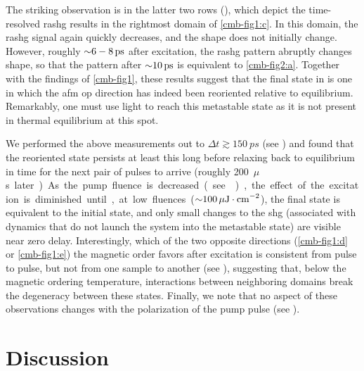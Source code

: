 The striking observation is in the latter two rows (), which depict the time-resolved \gls{rashg} results in the rightmost domain of \cref{cmb-fig1:c}.
In this domain, the \gls{rashg} signal again quickly decreases, and the shape does not initially change.
However, roughly ${\sim} \num{6}-\qty{8}{ps}$ after excitation, the \gls{rashg} pattern abruptly changes shape, so that the pattern after ${\sim} \qty{10}{ps}$ is equivalent to \cref{cmb-fig2:a}.
Together with the findings of \cref{cmb-fig1}, these results suggest that the final state in  is one in which the \gls{afm} \gls{op} direction has indeed been reoriented relative to equilibrium.
Remarkably, one must use light to reach this metastable state as it is not present in thermal equilibrium at this spot.

We performed the above measurements out to $\Delta t \gtrsim \qty{150}{ps}$ (see ) and found that the reoriented state persists at least this long before relaxing back to equilibrium in time for the next pair of pulses to arrive (roughly \qty{200}{$\mu$ s} later).
As the pump fluence is decreased (see ), the effect of the excitation is diminished until, at low fluences (${\sim} \qty{100}{\mu J \cdot cm^{-2}}$), the final state is equivalent to the initial state, and only small changes to the \gls{shg} (associated with dynamics that do not launch the system into the metastable state) are visible near zero delay.
Interestingly, which of the two opposite directions (\cref{cmb-fig1:d} or \cref{cmb-fig1:e}) the magnetic order favors after excitation is consistent from pulse to pulse, but not from one sample to another (see ), suggesting that, below the magnetic ordering temperature, interactions between neighboring domains break the degeneracy between these states.
Finally, we note that no aspect of these observations changes with the polarization of the pump pulse (see ).

\section{Discussion}

